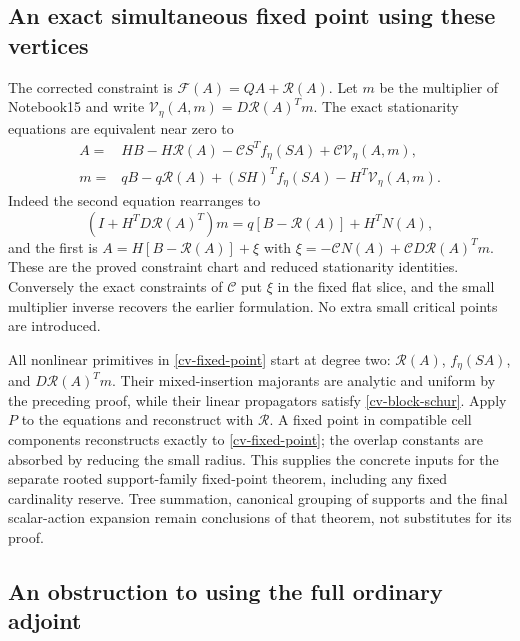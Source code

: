 \documentclass[11pt]{article}
\theoremstyle{remark}
\begin{document}
\subsection{An exact simultaneous fixed point using these vertices}
\label{cv-fixed-point-section}

The corrected constraint is $\mathcal F(A)=QA+\mathcal R(A)$.
Let $m$ be the multiplier of Notebook15 and write
$\mathcal V_\eta(A,m)=D\mathcal R(A)^Tm$.
The exact stationarity equations are equivalent near zero to
\begin{equation}\label{cv-fixed-point}
 \begin{split}
 A={}&HB-H\mathcal R(A)
          -\mathcal CS^Tf_\eta(SA)+\mathcal C\mathcal V_\eta(A,m),\\
 m={}&qB-q\mathcal R(A)
          +(SH)^Tf_\eta(SA)-H^T\mathcal V_\eta(A,m).
 \end{split}
\end{equation}
Indeed the second equation rearranges to
\[
 (I+H^TD\mathcal R(A)^T)m
        =q[B-\mathcal R(A)]+H^TN(A),
\]
and the first is $A=H[B-\mathcal R(A)]+\xi$ with
$\xi=-\mathcal CN(A)+\mathcal CD\mathcal R(A)^Tm$.
These are the proved constraint chart and reduced
stationarity identities. Conversely the exact constraints
of $\mathcal C$ put $\xi$ in the fixed flat slice, and the
small multiplier inverse recovers the earlier formulation.
No extra small critical points are introduced.

All nonlinear primitives in \eqref{cv-fixed-point} start at
degree two: $\mathcal R(A)$, $f_\eta(SA)$, and
$D\mathcal R(A)^Tm$. Their mixed-insertion majorants are
analytic and uniform by the preceding proof, while their
linear propagators satisfy \eqref{cv-block-schur}.
Apply $P$ to the equations and reconstruct with $\mathscr R$.
A fixed point in compatible cell components reconstructs
exactly to \eqref{cv-fixed-point}; the overlap constants are
absorbed by reducing the small radius. This supplies the
concrete inputs for the separate rooted support-family
fixed-point theorem, including any fixed cardinality reserve.
Tree summation, canonical grouping of supports and the final
scalar-action expansion remain conclusions of that theorem,
not substitutes for its proof.

\subsection{An obstruction to using the full ordinary adjoint}
\label{cv-ordinary-section}
\end{document}
